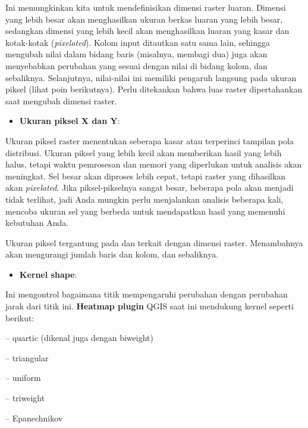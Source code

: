\documentclass[]{book}
\providecommand{\tightlist}{%
  \setlength{\itemsep}{0pt}\setlength{\parskip}{0pt}}
\begin{document}
Ini memungkinkan kita untuk mendefinisikan dimensi raster luaran. Dimensi yang lebih besar akan menghasilkan ukuran berkas luaran yang lebih besar, sedangkan dimensi yang lebih kecil akan menghasilkan luaran yang kasar dan kotak-kotak (\emph{pixelated}). Kolom input ditautkan satu sama lain, sehingga mengubah nilai dalam bidang baris (misalnya, membagi dua) juga akan menyebabkan perubahan yang sesuai dengan nilai di bidang kolom, dan sebaliknya. Selanjutnya, nilai-nilai ini memiliki pengaruh langsung pada ukuran piksel (lihat poin berikutnya). Perlu ditekankan bahwa luas raster dipertahankan saat mengubah dimensi raster.

\begin{itemize}
\tightlist
\item
  \textbf{Ukuran piksel X dan Y}:
\end{itemize}

Ukuran piksel raster menentukan seberapa kasar atau terperinci tampilan pola distribusi. Ukuran piksel yang lebih kecil akan memberikan hasil yang lebih halus, tetapi waktu pemrosesan dan memori yang diperlukan untuk analisis akan meningkat. Sel besar akan diproses lebih cepat, tetapi raster yang dihasilkan akan \emph{pixelated}. Jika piksel-pikselnya sangat besar, beberapa pola akan menjadi tidak terlihat, jadi Anda mungkin perlu menjalankan analisis beberapa kali, mencoba ukuran sel yang berbeda untuk mendapatkan hasil yang memenuhi kebutuhan Anda.

Ukuran piksel tergantung pada dan terkait dengan dimensi raster. Menambahnya akan mengurangi jumlah baris dan kolom, dan sebaliknya.

\begin{itemize}
\tightlist
\item
  \textbf{Kernel shape}:
\end{itemize}

Ini mengontrol bagaimana titik mempengaruhi perubahan dengan perubahan jarak dari titik ini. \textbf{Heatmap plugin} QGIS saat ini mendukung kernel seperti berikut:

-- quartic (dikenal juga dengan biweight)

-- triangular

-- uniform

-- triweight

-- Epanechnikov
\end{document}
